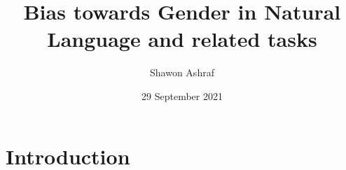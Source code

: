 \documentclass{article}
\title{Bias towards Gender in Natural Language and related tasks}
\author{Shawon Ashraf}
\date{29 September 2021}
\begin{document}
\section{Introduction}



\printbibliography
\end{document}
